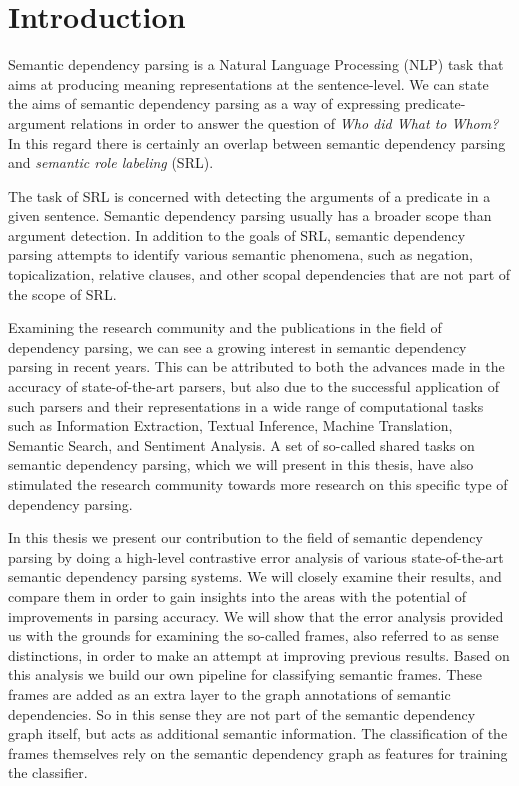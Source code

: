 \chapter{Introduction}
\label{chap:introduction}

Semantic dependency parsing is a Natural Language Processing (NLP) task that aims at producing meaning representations at the sentence-level. We can state the aims of semantic dependency parsing as a way of expressing predicate-argument relations in order to answer the question of \textit{Who did What to Whom?} In this regard there is certainly an overlap between semantic dependency parsing  and \textit{semantic role labeling} (SRL). 

The task of SRL is concerned with detecting the arguments of a predicate in a given sentence. Semantic dependency parsing usually has a broader scope than argument detection. In addition to the goals of SRL, semantic dependency parsing attempts to identify various semantic phenomena, such as negation, topicalization, relative clauses, and other scopal dependencies that are not part of the scope of SRL.

Examining the research community and the publications in the field of dependency parsing, we can see a growing interest in semantic dependency parsing in recent years. This can be attributed to both the advances made in the accuracy of state-of-the-art parsers, but also due to the successful application of such parsers and their representations in a wide range of computational tasks such as Information Extraction, Textual Inference, Machine Translation, Semantic Search, and Sentiment Analysis. A set of so-called shared tasks on semantic dependency parsing, which we will present in this thesis, have also stimulated the research community towards more research on this specific type of dependency parsing.

In this thesis we present our contribution to the field of semantic dependency parsing by doing a high-level contrastive error analysis of various state-of-the-art semantic dependency parsing systems. We will closely examine their results, and compare them in order to gain insights into the areas with the potential of improvements in parsing accuracy. We will show that the error analysis provided us with the grounds for examining the so-called frames, also referred to as sense distinctions, in order to make an attempt at improving previous results. Based on this analysis we build our own pipeline for classifying semantic frames. These frames are added as an extra layer to the graph annotations of semantic dependencies. So in this sense they are not part of the semantic dependency graph itself, but acts as additional semantic information. The classification of the frames themselves rely on the semantic dependency graph as features for training the classifier.

